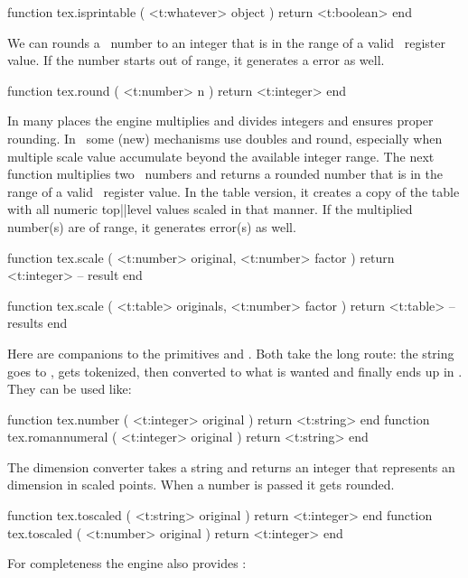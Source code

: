 \starttyping[option=LUA]
function tex.isprintable ( <t:whatever> object )
    return <t:boolean>
end
\stoptyping

\stopsubsection

\startsubsection [title=Numbers and dimensions]

We can rounds a \LUA\ number to an integer that is in the range of a valid \TEX\
register value. If the number starts out of range, it generates a \quote {number
too big} error as well.

\starttyping[option=LUA]
function tex.round ( <t:number> n )
    return <t:integer>
end
\stoptyping

In many places the engine multiplies and divides integers and ensures proper
rounding. In \LUAMETATEX\ some (new) mechanisms use doubles and round, especially
when multiple scale value accumulate beyond the available integer range. The next
function multiplies two \LUA\ numbers and returns a rounded number that is in the
range of a valid \TEX\ register value. In the table version, it creates a copy of
the table with all numeric top||level values scaled in that manner. If the
multiplied number(s) are of range, it generates \quote {number too big} error(s)
as well.

\starttyping[option=LUA]
function tex.scale ( <t:number> original, <t:number> factor )
    return <t:integer> -- result
end

function tex.scale ( <t:table> originals, <t:number> factor )
    return <t:table> -- results
end
\stoptyping

Here are companions to the primitives \type {\number} and \type {\romannumeral}.
Both take the long route: the string goes to \TEX, gets tokenized, then converted
to what is wanted and finally ends up in \LUA. They can be used like:

\starttyping[option=LUA]
function tex.number       ( <t:integer> original ) return <t:string> end
function tex.romannumeral ( <t:integer> original ) return <t:string> end
\stoptyping

The dimension converter takes a string and returns an integer that represents an
dimension in scaled points. When a number is passed it gets rounded.

\starttyping[option=LUA]
function tex.toscaled ( <t:string> original ) return <t:integer> end
function tex.toscaled ( <t:number> original ) return <t:integer> end
\stoptyping

For completeness the engine also provides :

